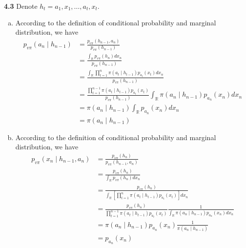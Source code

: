 \noindent\textbf{4.3}
Denote $h_t = a_1, x_1, \ldots, a_t, x_t$.
\begin{enumerate}[(a)]
    \item According to the definition of conditional probability and marginal distribution, we have
    \begin{equation*}
    \begin{aligned}
        p_{v\pi}(a_n \mid h_{n - 1}) &= \frac{p_{v\pi}(h_{n-1}, a_n)}{p_{v\pi}(h_{n-1})}\\
        &= \frac{\int_\mathbb{R}p_{v\pi}(h_n) d x_n}{p_{v\pi}(h_{n-1})}\\
        &= \frac{\int_\mathbb{R}\prod_{t=1}^{n} \pi\left(a_{t} \mid h_{t-1}\right) p_{a_{t}}\left(x_{t}\right) d x_n}{p_{v\pi}(h_{n-1})}\\
        &= \frac{\prod_{t=1}^{n-1} \pi\left(a_{t} \mid h_{t-1}\right) p_{a_{t}}\left(x_{t}\right)}{p_{v\pi}(h_{n-1})} \int_\mathbb{R} \pi\left(a_{n} \mid h_{n-1}\right) p_{a_{n}}\left(x_{n}\right) d x_n\\
        &= \pi\left(a_{n} \mid h_{n-1}\right) \int_\mathbb{R} p_{a_{n}}\left(x_{n}\right) d x_n\\
        &= \pi\left(a_{n} \mid h_{n-1}\right)
    \end{aligned}
    \end{equation*}

    \item According to the definition of conditional probability and marginal distribution, we have
    \begin{equation*}
    \begin{aligned}
        p_{v\pi}(x_n \mid h_{n - 1}, a_n) &= \frac{p_{v\pi}(h_n)}{p_{v\pi}(h_{n-1}, a_n)}\\
        &= \frac{p_{v\pi}(h_n)}{\int_\mathbb{R} p_{v\pi}(h_{n}) d x_n}\\
        &= \frac{p_{v\pi}(h_n)}{\int_\mathbb{R} \left[\prod_{t=1}^{n} \pi\left(a_{t} \mid h_{t-1}\right) p_{a_{t}}\left(x_{t}\right)\right] d x_n}\\
        &= \frac{p_{v\pi}(h_n)}{\prod_{t=1}^{n-1} \pi\left(a_{t} \mid h_{t-1}\right) p_{a_{t}}\left(x_{t}\right)} \frac{1}{\int_\mathbb{R} \pi\left(a_{n} \mid h_{n-1}\right) p_{a_{n}}\left(x_{n}\right) d x_n}\\
        &= \pi\left(a_{n} \mid h_{n-1}\right) p_{a_{n}}\left(x_{n}\right) \frac{1}{\pi\left(a_{n} \mid h_{n-1}\right)}\\
        &= p_{a_{n}}\left(x_{n}\right)
    \end{aligned}
    \end{equation*}
\end{enumerate}

